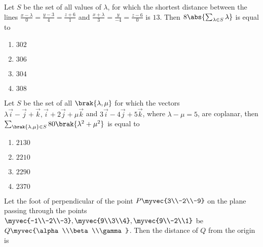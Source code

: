 \iffalse
  \title{2023}
  \author{EE24BTECH11002}
  \section{mcq-single}
\fi 
    
    \item Let $S$ be the set of all values of $\lambda$, for which the shortest distance between the lines $\frac{x - \lambda}{0} = \frac{y - 3}{4} = \frac{z + 6}{1}$ and $\frac{x + \lambda}{3} = \frac{y}{-4} = \frac{z - 6}{0}$ is $13$. Then $8\abs{\sum_{\lambda \in S} \lambda}$ is equal to
    \hfill{}

	\begin{enumerate}
		\item $302$ 
		\item $306$
		\item $304$
		\item $308$
	\end{enumerate}

    \item Let $S$ be the set of all $\brak{\lambda, \mu}$ for which the vectors $\lambda\vec{i} - \vec{j} + \vec{k}, \vec{i} + 2\vec{j} + \mu\vec{k}$ and $3\vec{i} -4\vec{j} + 5\vec{k}$, where $\lambda - \mu  = 5$, are coplanar, then $\sum_{\brak{\lambda, \mu} \in S} 80\brak{\lambda^2 + \mu^2}$ is equal to
    \hfill{}

	\begin{enumerate}
		\item $2130$ 
		\item $2210$
		\item $2290$
		\item $2370$
	\end{enumerate}

    \item Let the foot of perpendicular of the point $P\myvec{3\\-2\\-9}$ on the plane passing through the points $\myvec{-1\\-2\\-3}, \myvec{9\\3\\4}, \myvec{9\\-2\\1}$ be $Q\myvec{\alpha\\\beta\\\gamma}$. Then the distance of $Q$ from the origin is
    \hfill{}

